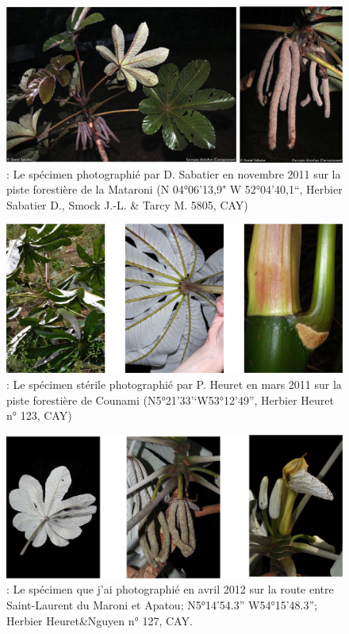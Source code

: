 \documentclass[a4paper]{article}
\theoremstyle{definition}
\theoremstyle{definition}
\theoremstyle{definition}
\theoremstyle{remark}
\begin{document}
\begin{figure}[H]

{\centering \includegraphics[width=0.8\linewidth]{figure/fig11} 

}

\caption{: Le spécimen photographié par D. Sabatier en novembre 2011
sur la piste forestière de la Mataroni (N 04°06'13,9" W 52°04'40,1``,
Herbier Sabatier D., Smock J.-L. \& Tarcy M. 5805, CAY)}\label{fig:fig11}
\end{figure}





\begin{figure}[H]

{\centering \includegraphics[width=0.8\linewidth]{figure/fig12} 

}

\caption{: Le spécimen stérile photographié par P. Heuret en mars
2011 sur la piste forestière de Counami (N5°21'33'`W53°12'49'', Herbier
Heuret n° 123, CAY)}\label{fig:fig12}
\end{figure}





\begin{figure}[H]

{\centering \includegraphics[width=0.8\linewidth]{figure/fig13} 

}

\caption{: Le spécimen que j'ai photographié en avril 2012 sur la
route entre Saint-Laurent du Maroni et Apatou; N5°14'54.3''
W54°15'48.3''; Herbier Heuret\&Nguyen n° 127, CAY.}\label{fig:fig13}
\end{figure}
\end{document}

